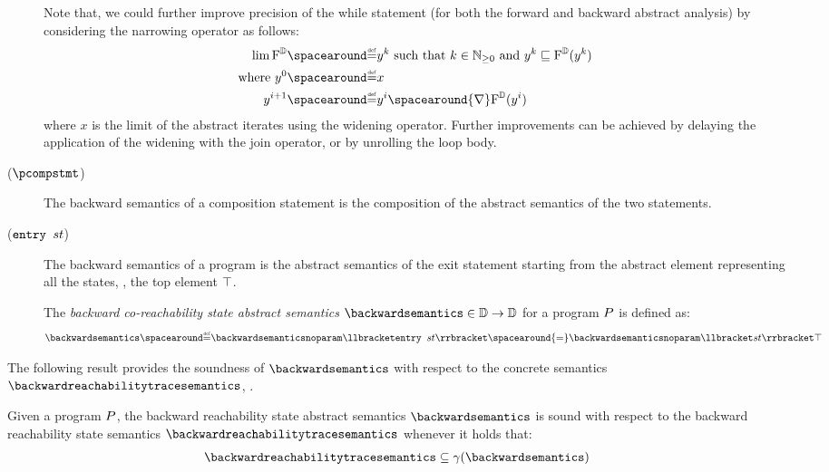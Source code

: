 \begin{description}
  Note that, we could further improve precision of the while statement (for both the forward and backward abstract analysis) by considering the narrowing operator as follows:
  \begin{align*}
    \lim \abstractdomaintransformer &\DefeQ y^k \text{ such that } k\in\Npos \text{ and } y^k \abstractdomainsubseteq \abstractdomaintransformer(y^k) \\
    \text{where } y^0 &\DefeQ x \\
    y^{i+1} &\DefeQ y^i \spacearound{\abstractdomainwidening} \abstractdomaintransformer(y^i)
  \end{align*}
  where $x$ is the limit of the abstract iterates using the widening operator.
  Further improvements can be achieved by delaying the application of the widening with the join operator, or by unrolling the loop body.
  \item[\normalfont ($\pcompstmt$)] The backward semantics of a composition statement is the composition of the abstract semantics of the two statements.
  \item[\normalfont ($\textup{\texttt{entry }} st$)]
    The backward semantics of a program is the abstract semantics of the exit statement starting from the abstract element representing all the states, \ie, the top element $\top$.
    \begin{definition}
      The \emph{backward co-reachability state abstract semantics} $\backwardsemantics\in\backwardtype$ for a program $P$ is defined as:
      \begin{align*}
        \backwardsemantics \DefeQ \backwardsemanticsnoparam \semanticsof{\progstmt} \spacearound{=} \backwardsemanticsnoparam \semanticsof{\defstmt}\abstractdomaintop
      \end{align*}
    \end{definition}
\end{description}


The following result provides the soundness of $\backwardsemantics$ with respect to the concrete semantics $\backwardreachabilitytracesemantics$, \cf{} .

\begin{theorem}
  Given a program $P$, the backward reachability state abstract semantics $\backwardsemantics$ is sound with respect to the backward reachability state semantics $\backwardreachabilitytracesemantics$ whenever it holds that:
  \begin{align*}
    \backwardreachabilitytracesemantics \subseteq \abstractdomainconcretization(\backwardsemantics)
  \end{align*}
\end{theorem}

